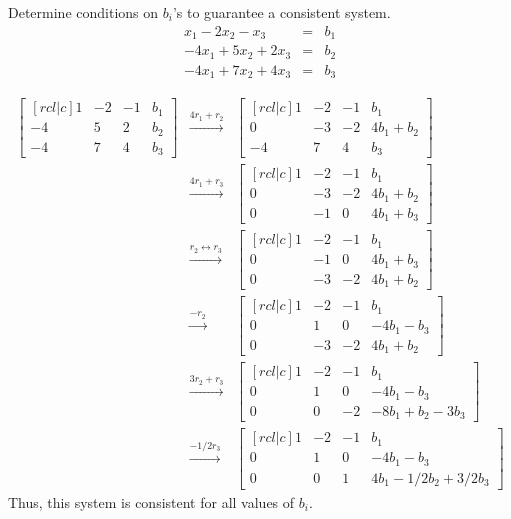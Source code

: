 \ii Determine conditions on $b_i$'s to guarantee a consistent system.
\begin{eqnarray*}
x_1-2x_2-x_3&=&b_1\\
-4x_1+5x_2+2x_3&=&b_2\\
-4x_1+7x_2+4x_3&=&b_3
\end{eqnarray*}
\begin{solution}
\begin{eqnarray*}
\begin{bmatrix}[rcl|c]
1&-2&-1&b_1\\
-4&5&2&b_2\\
-4&7&4&b_3
\end{bmatrix}
&\xrightarrow[]{4r_1+r_2}&
\begin{bmatrix}[rcl|c]
1&-2&-1&b_1\\
0&-3&-2&4b_1+b_2\\
-4&7&4&b_3
\end{bmatrix}\\
&\xrightarrow[]{4r_1+r_3}&
\begin{bmatrix}[rcl|c]
1&-2&-1&b_1\\
0&-3&-2&4b_1+b_2\\
0&-1&0&4b_1+b_3
\end{bmatrix}\\
&\xrightarrow[]{r_2 \leftrightarrow r_3}&
\begin{bmatrix}[rcl|c]
1&-2&-1&b_1\\
0&-1&0&4b_1+b_3\\
0&-3&-2&4b_1+b_2
\end{bmatrix}\\
&\xrightarrow[]{-r_2}&
\begin{bmatrix}[rcl|c]
1&-2&-1&b_1\\
0&1&0&-4b_1-b_3\\
0&-3&-2&4b_1+b_2
\end{bmatrix}\\
&\xrightarrow[]{3r_2+r_3}&
\begin{bmatrix}[rcl|c]
1&-2&-1&b_1\\
0&1&0&-4b_1-b_3\\
0&0&-2&-8b_1+b_2-3b_3
\end{bmatrix}\\
&\xrightarrow[]{-1/2r_3}&
\begin{bmatrix}[rcl|c]
1&-2&-1&b_1\\
0&1&0&-4b_1-b_3\\
0&0&1&4b_1-1/2b_2+3/2b_3
\end{bmatrix}
\end{eqnarray*}
Thus, this system is consistent for all values of $b_i$.
\end{solution}


